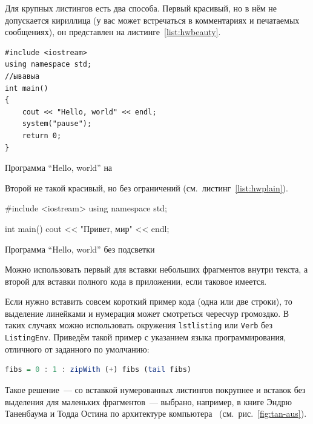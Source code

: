 Для крупных листингов есть два способа. Первый красивый, но в нём не допускается
кириллица (у вас может встречаться в комментариях и
печатаемых сообщениях), он представлен на листинге~\ref{list:hwbeauty}.
\begin{ListingEnv}[H]%
\begin{lstlisting}
#include <iostream>
using namespace std;
//ывавыа
int main()
{
    cout << "Hello, world" << endl;
    system("pause");
    return 0;
}
\end{lstlisting}
\caption{Программа “Hello, world” на \protect\cpp}
\label{list:hwbeauty}
\end{ListingEnv}

Второй не такой красивый, но без ограничений (см.~листинг~\ref{list:hwplain}).
\begin{ListingEnv}[H]
\begin{Verb}

#include <iostream>
using namespace std;

int main()
{
    cout << "Привет, мир" << endl;
}
\end{Verb}
\caption{Программа “Hello, world” без подсветки}
\label{list:hwplain}
\end{ListingEnv}

Можно использовать первый для вставки небольших фрагментов
внутри текста, а второй для вставки полного
кода в приложении, если таковое имеется.

Если нужно вставить совсем короткий пример кода (одна или две строки), то выделение  линейками и нумерация может смотреться чересчур громоздко. В таких случаях можно использовать окружения \texttt{lstlisting} или \texttt{Verb} без \texttt{ListingEnv}. Приведём такой пример с указанием языка программирования, отличного от заданного по умолчанию:
\begin{lstlisting}[language=Haskell]
fibs = 0 : 1 : zipWith (+) fibs (tail fibs)
\end{lstlisting}
Такое решение~--- со вставкой нумерованных листингов покрупнее
и вставок без выделения для маленьких фрагментов~--- выбрано,
например, в книге Эндрю Таненбаума и Тодда Остина по архитектуре
компьютера~\autocite{TanAus2013} (см.~рис.~\ref{fig:tan-aus}).

